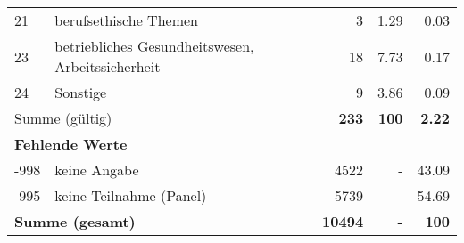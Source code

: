 \begin{longtable}{lXrrr}
        21 & \multicolumn{1}{X}{berufsethische Themen} & %
          \num{3} &
          \num[round-mode=places,round-precision=2]{1.29} &
          \num[round-mode=places,round-precision=2]{0.03} \\

        23 & \multicolumn{1}{X}{betriebliches Gesundheitswesen, Arbeitssicherheit} & %
          \num{18} &
          \num[round-mode=places,round-precision=2]{7.73} &
          \num[round-mode=places,round-precision=2]{0.17} \\

        24 & \multicolumn{1}{X}{Sonstige} & %
          \num{9} &
          \num[round-mode=places,round-precision=2]{3.86} &
          \num[round-mode=places,round-precision=2]{0.09} \\

     \midrule
     \multicolumn{2}{l}{Summe (gültig)} &
       \textbf{\num{233}} &
     \textbf{\num{100}} &
       \textbf{\num[round-mode=places,round-precision=2]{2.22}} \\
     \multicolumn{5}{l}{\textbf{Fehlende Werte}}\\
       -998 &
       keine Angabe &
         \num{4522} &
        - &
         \num[round-mode=places,round-precision=2]{43.09} \\
       -995 &
       keine Teilnahme (Panel) &
         \num{5739} &
        - &
         \num[round-mode=places,round-precision=2]{54.69} \\
     \midrule
     \multicolumn{2}{l}{\textbf{Summe (gesamt)}} &
          \textbf{\num{10494}} &
        \textbf{-} &
        \textbf{\num{100}} \\
     \bottomrule
     \end{longtable}
     
